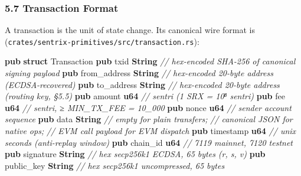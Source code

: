 \documentclass[11pt,a4paper]{article}
\providecommand{\NormalTok}[1]{#1}
\providecommand{\KeywordTok}[1]{\textbf{#1}}
\providecommand{\DataTypeTok}[1]{\textbf{#1}}
\providecommand{\CommentTok}[1]{\textit{#1}}
\newenvironment{Shaded}{}{}
\newenvironment{Highlighting}[1][]{\par\noindent\begin{minipage}{\linewidth}\ttfamily\small}{\end{minipage}\par}
\begin{document}
\hypertarget{57-transaction-format}{%
\subsubsection{5.7 Transaction Format}\label{57-transaction-format}}

A transaction is the unit of state change. Its canonical wire format is
(\texttt{crates/sentrix-primitives/src/transaction.rs}):

\begin{Shaded}
\begin{Highlighting}[]
\KeywordTok{pub} \KeywordTok{struct}\NormalTok{ Transaction }\OperatorTok{\{}
    \KeywordTok{pub}\NormalTok{ txid}\OperatorTok{:}         \DataTypeTok{String}\OperatorTok{,}      \CommentTok{// hex{-}encoded SHA{-}256 of canonical signing payload}
    \KeywordTok{pub}\NormalTok{ from\_address}\OperatorTok{:} \DataTypeTok{String}\OperatorTok{,}      \CommentTok{// hex{-}encoded 20{-}byte address (ECDSA{-}recovered)}
    \KeywordTok{pub}\NormalTok{ to\_address}\OperatorTok{:}   \DataTypeTok{String}\OperatorTok{,}      \CommentTok{// hex{-}encoded 20{-}byte address (routing key, §5.5)}
    \KeywordTok{pub}\NormalTok{ amount}\OperatorTok{:}       \DataTypeTok{u64}\OperatorTok{,}         \CommentTok{// sentri (1 SRX = 10⁸ sentri)}
    \KeywordTok{pub}\NormalTok{ fee}\OperatorTok{:}          \DataTypeTok{u64}\OperatorTok{,}         \CommentTok{// sentri, ≥ MIN\_TX\_FEE = 10\_000}
    \KeywordTok{pub}\NormalTok{ nonce}\OperatorTok{:}        \DataTypeTok{u64}\OperatorTok{,}         \CommentTok{// sender account sequence}
    \KeywordTok{pub}\NormalTok{ data}\OperatorTok{:}         \DataTypeTok{String}\OperatorTok{,}      \CommentTok{// empty for plain transfers;}
                                   \CommentTok{// canonical JSON for native ops;}
                                   \CommentTok{// EVM call payload for EVM dispatch}
    \KeywordTok{pub}\NormalTok{ timestamp}\OperatorTok{:}    \DataTypeTok{u64}\OperatorTok{,}         \CommentTok{// unix seconds (anti{-}replay window)}
    \KeywordTok{pub}\NormalTok{ chain\_id}\OperatorTok{:}     \DataTypeTok{u64}\OperatorTok{,}         \CommentTok{// 7119 mainnet, 7120 testnet}
    \KeywordTok{pub}\NormalTok{ signature}\OperatorTok{:}    \DataTypeTok{String}\OperatorTok{,}      \CommentTok{// hex secp256k1 ECDSA, 65 bytes (r, s, v)}
    \KeywordTok{pub}\NormalTok{ public\_key}\OperatorTok{:}   \DataTypeTok{String}\OperatorTok{,}      \CommentTok{// hex secp256k1 uncompressed, 65 bytes}
\OperatorTok{\}}
\end{Highlighting}
\end{Shaded}
\end{document}
